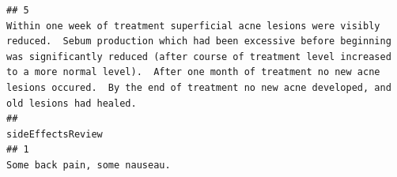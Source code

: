 \documentclass[spanish,]{article}
\begin{document}
\begin{verbatim}
## 5                                                                                                                                                                                                                                                                                                                                                                                                                                                                                                                                                                        Within one week of treatment superficial acne lesions were visibly reduced.  Sebum production which had been excessive before beginning was significantly reduced (after course of treatment level increased to a more normal level).  After one month of treatment no new acne lesions occured.  By the end of treatment no new acne developed, and old lesions had healed.
##                                                                                                                                                                                                                                                                                                                                                                                                                                                                                                                                                                                                                                                                                                                                                                                                                                                                                                                                                                                             sideEffectsReview
## 1                                                                                                                                                                                                                                                                                                                                                                                                                                                                                                                                                                                                                                                                                                                                                                                                                                                                                                                                                                               Some back pain, some nauseau.

\end{verbatim}
\end{document}
